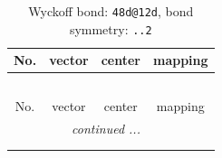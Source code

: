 \documentclass[fleqn,8pt]{jsarticle}
\begin{document}
\renewcommand{\arraystretch}{1.2}
\begin{longtable}{cccc}
\caption{Wyckoff bond: {\tt 48d@12d}, bond symmetry: {\tt ..2}}
 \\
 \hline \hline
No. & vector & center & mapping \\ \hline \endfirsthead

\multicolumn{3}{l}{\tablename\ \thetable{}} \\
 \hline \hline
No. & vector & center & mapping \\ \hline \endhead

 \hline \hline
\multicolumn{3}{r}{\footnotesize\it continued ...} \\ \endfoot

 \hline \hline
\multicolumn{3}{r}{} \\ \endlastfoot


\end{longtable}
\end{document}
